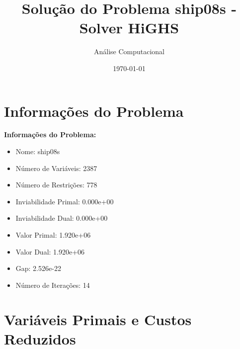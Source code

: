 \documentclass[12pt]{article}
\title{Solução do Problema ship08s - Solver HiGHS}
\author{Análise Computacional}
\date{\today}
\begin{document}
\maketitle

\section{Informações do Problema}

\textbf{Informações do Problema:}
\begin{itemize}
\item Nome: ship08s
\item Número de Variáveis: 2387
\item Número de Restrições: 778
\item Inviabilidade Primal: 0.000e+00
\item Inviabilidade Dual: 0.000e+00
\item Valor Primal: 1.920e+06
\item Valor Dual: 1.920e+06
\item Gap: 2.526e-22
\item Número de Iterações: 14
\end{itemize}


\section{Variáveis Primais e Custos Reduzidos}
\end{document}
